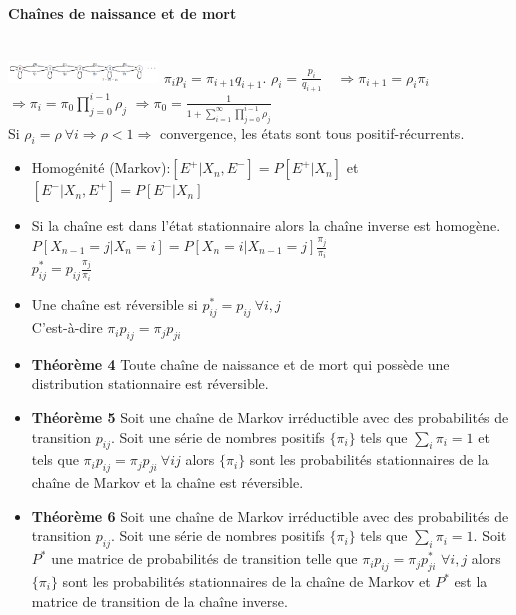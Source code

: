 \documentclass[paper=a4,fontsize=8pt,pagesize,DIV=calc]{scrartcl}
\newcounter{row}
\begin{document}
\begin{multicols}{3}
\paragraph{Chaînes de naissance et de mort}~~\\
\includegraphics[width=0.3\textwidth]{Death}
$\pi_ip_i = \pi_{i+1}q_{i+1}.$ \quad $\rho_i=\frac{p_i}{q_{i+1}} \quad \Rightarrow \pi_{i+1}=\rho_i\pi_i$
\\$\Rightarrow \pi_i=\pi_0 \prod_{j=0}^{i-1} \rho_j$ \quad $\Rightarrow \pi_0=\frac{1}{1+\sum_{i=1}^\infty \prod_{j=0}^{i-1} \rho_j}$
\\ Si $\rho_i =\rho \  \forall i \Rightarrow \rho<1 \Rightarrow$ convergence, les états sont tous positif-récurrents.
\begin{itemize}
\item Homogénité (Markov):$[E^+|X_n,E^-]=P[E^+|X_n]$ et $[E^-|X_n,E^+]=P[E^-|X_n]$
\item Si la chaîne est dans l’état stationnaire alors la chaîne inverse est homogène.
\\ $P[X_{n-1} = j|X_n = i] = P[X_n = i|X_{n-1} = j]\frac{\pi_j}{\pi_i}$
\\$p^*_{ij}=p_{ij}\frac{\pi_j}{\pi_i}$
\item Une chaîne est réversible si $p^*_{ij}=p_{ij} \ \forall i,j$
\\ C'est-à-dire $\pi_ip_{ij}=\pi_j p_{ji}$
\item \textbf{Théorème 4}  Toute chaîne de naissance et de mort qui possède une distribution stationnaire est réversible.
\item \textbf{Théorème 5} Soit une chaîne de Markov irréductible avec des probabilités de transition $p_{ij}$. Soit une série de nombres positifs $\{\pi_i\}$ tels que $\sum_i \pi_i=1$ et tels que $\pi_ip_{ij} = \pi_jp_{ji} \ \forall i j$ alors $\{\pi_i\}$ sont les probabilités stationnaires de la chaîne de Markov et la chaîne est réversible.
\item \textbf{Théorème 6} Soit une chaîne de Markov irréductible avec des probabilités de transition $p_{ij}$. Soit une série de nombres positifs $\{\pi_i\}$ tels que $\sum_i \pi_i=1$. Soit $P^*$ une matrice de probabilités de transition telle que
$\pi_ip_{ij} = \pi_jp^*_{ji}$ $\forall i,j$  alors $\{\pi_i\}$ sont les probabilités stationnaires de la chaîne de Markov et $P^*$ est la matrice de transition de la chaîne inverse.
\end{itemize}

\end{multicols}
\end{document}
